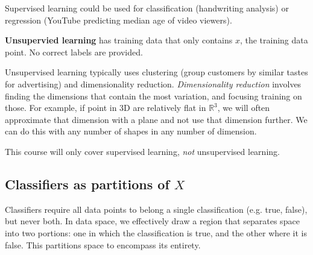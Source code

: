\documentclass[titlepage, 12pt, leqno]{article}
\begin{document}
Supervised learning could be used for classification (handwriting analysis) or
regression (YouTube predicting median age of video viewers).

\begin{definition}
    \textbf{Unsupervied learning} has training data that only contains $x$, the
    training data point. No correct labels are provided.
\end{definition}

Unsupervised learning typically uses clustering (group customers by similar tastes
for advertising) and dimensionality reduction. \textit{Dimensionality reduction}
involves finding the dimensions that contain the most variation, and focusing
training on those. For example, if point in 3D are relatively flat in 
$ \mathbb{R}^{3}$, we will often approximate that dimension with a plane and not
use that dimension further. We can do this with any number of shapes in any number
of dimension. 

\begin{note}
    This course will only cover supervised learning, \textit{not} unsupervised
    learning.
\end{note}

\subsection{Classifiers as partitions of $X$}
Classifiers require all data points to belong a single classification (e.g.
true, false), but never both. In data space, we effectively draw a region that
separates space into two portions: one in which the classification is true, and
the other where it is false. This partitions space to encompass its entirety.
 
\end{document}
